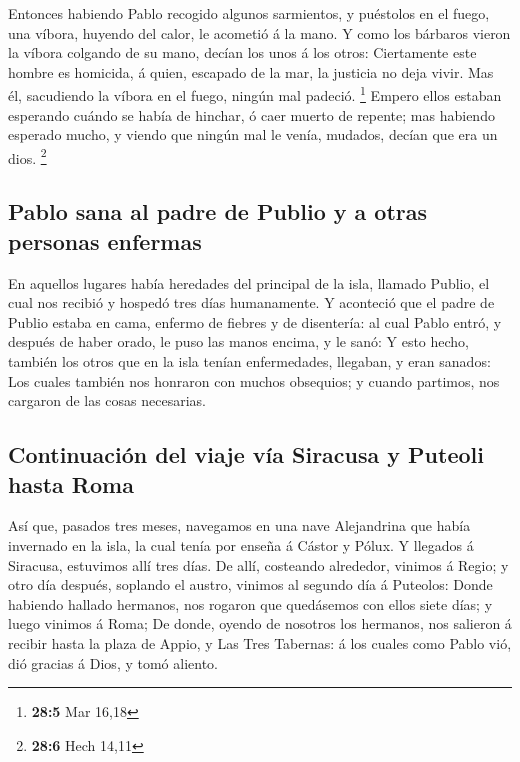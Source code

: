  Entonces habiendo Pablo recogido algunos sarmientos, y
puéstolos en el fuego, una víbora, huyendo del calor, le acometió á la
mano.  Y como los bárbaros vieron la víbora colgando de su
mano, decían los unos á los otros: Ciertamente este hombre es homicida,
á quien, escapado de la mar, la justicia no deja vivir.  Mas
él, sacudiendo la víbora en el fuego, ningún mal padeció. \footnote{\textbf{28:5}
  Mar 16,18}  Empero ellos estaban esperando cuándo se había
de hinchar, ó caer muerto de repente; mas habiendo esperado mucho, y
viendo que ningún mal le venía, mudados, decían que era un dios.
\footnote{\textbf{28:6} Hech 14,11}

\hypertarget{pablo-sana-al-padre-de-publio-y-a-otras-personas-enfermas}{%
\subsection{Pablo sana al padre de Publio y a otras personas
enfermas}\label{pablo-sana-al-padre-de-publio-y-a-otras-personas-enfermas}}

 En aquellos lugares había heredades del principal de la
isla, llamado Publio, el cual nos recibió y hospedó tres días
humanamente.  Y aconteció que el padre de Publio estaba en
cama, enfermo de fiebres y de disentería: al cual Pablo entró, y después
de haber orado, le puso las manos encima, y le sanó:  Y esto
hecho, también los otros que en la isla tenían enfermedades, llegaban, y
eran sanados:  Los cuales también nos honraron con muchos
obsequios; y cuando partimos, nos cargaron de las cosas necesarias.

\hypertarget{continuaciuxf3n-del-viaje-vuxeda-siracusa-y-puteoli-hasta-roma}{%
\subsection{Continuación del viaje vía Siracusa y Puteoli hasta
Roma}\label{continuaciuxf3n-del-viaje-vuxeda-siracusa-y-puteoli-hasta-roma}}

 Así que, pasados tres meses, navegamos en una nave
Alejandrina que había invernado en la isla, la cual tenía por enseña á
Cástor y Pólux.  Y llegados á Siracusa, estuvimos allí tres
días.  De allí, costeando alrededor, vinimos á Regio; y
otro día después, soplando el austro, vinimos al segundo día á Puteolos:
 Donde habiendo hallado hermanos, nos rogaron que
quedásemos con ellos siete días; y luego vinimos á Roma; 
De donde, oyendo de nosotros los hermanos, nos salieron á recibir hasta
la plaza de Appio, y Las Tres Tabernas: á los cuales como Pablo vió, dió
gracias á Dios, y tomó aliento.

